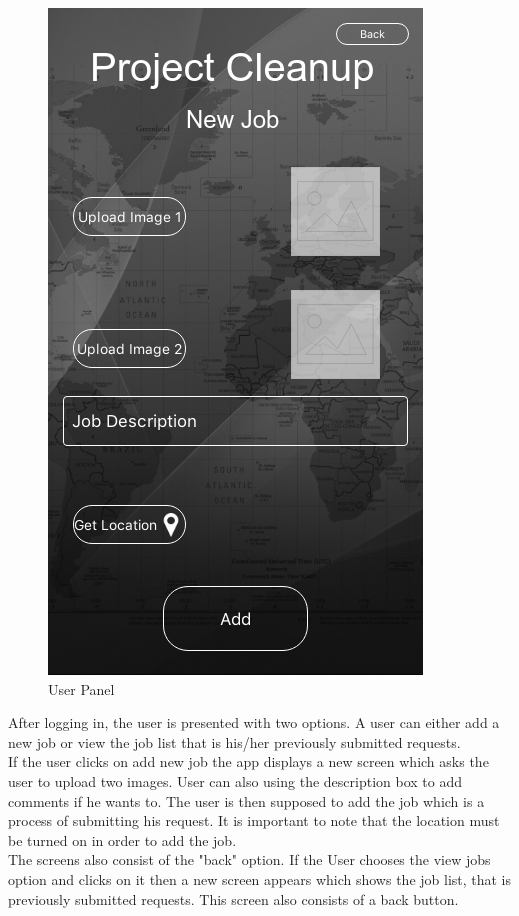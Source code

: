 \begin{figure}[!hb]
   \includegraphics[scale=0.5]{images/4.png}
   
 
   \caption{User Panel}\label{fig:picture}
\end{figure}
After logging in, the user is presented with two options. A user can either add a new job or view the job list that is his/her previously submitted requests.\\
If the user clicks on add new job the app displays a new screen which asks the user to upload two images. User can also using the description box to add comments if he wants to. The user is then supposed to add the job which is a process of submitting his request. It is important to note that the location must be turned on in order to add the job.\\
The screens also consist of the "back" option.
If the User chooses the view jobs option and clicks on it then a new screen appears which shows the job list, that is previously submitted requests. This screen also consists of a back button.\\
